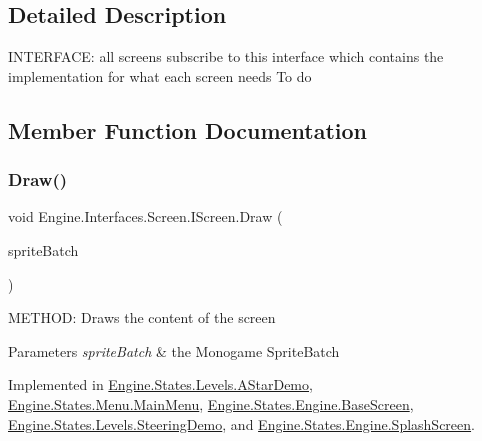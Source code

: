 \subsection{Detailed Description}
I\+N\+T\+E\+R\+F\+A\+CE\+: all screens subscribe to this interface which contains the implementation for what each screen needs To do 



\subsection{Member Function Documentation}
\mbox{\label{a00466_a0c61f739fb252fcc90b91b1358511d05}} 
\subsubsection{\texorpdfstring{Draw()}{Draw()}}
{\footnotesize\ttfamily void Engine.\+Interfaces.\+Screen.\+I\+Screen.\+Draw (\begin{DoxyParamCaption}\item[{Sprite\+Batch}]{sprite\+Batch }\end{DoxyParamCaption})}



M\+E\+T\+H\+OD\+: Draws the content of the screen 


\begin{DoxyParams}{Parameters}
{\em sprite\+Batch} & the Monogame Sprite\+Batch\\
\hline
\end{DoxyParams}


Implemented in \hyperlink{a00562_ad5b2061652982cb94e7c01c39f59a984}{Engine.\+States.\+Levels.\+A\+Star\+Demo}, \hyperlink{a00574_a193970cc59914f538ae0bcd39fe1ef48}{Engine.\+States.\+Menu.\+Main\+Menu}, \hyperlink{a00550_a200c31954effe5fc060118607155fb16}{Engine.\+States.\+Engine.\+Base\+Screen}, \hyperlink{a00570_a32c772a646fe78f26a4e9f83ae327156}{Engine.\+States.\+Levels.\+Steering\+Demo}, and \hyperlink{a00554_ae50fb213e5c1efc8d3908340b236e927}{Engine.\+States.\+Engine.\+Splash\+Screen}.

\mbox{\label{a00466_ad251ad712685a0f329ad2b29bde78981}} 
